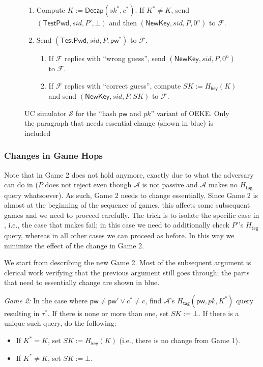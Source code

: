 \documentclass{article}
\theoremstyle{plain}
\theoremstyle{definition}
\theoremstyle{remark}
\newcommand{\adv}{\mathcal{A}}
\renewcommand{\sim}{\mathcal{S}}
\newcommand{\func}{\mathcal{F}}
\newcommand{\Decap}{\mathsf{Decap}}
\newcommand{\Hkey}{H_\mathsf{key}}
\newcommand{\Htag}{H_\mathsf{tag}}
\newcommand{\pw}{\mathsf{pw}}
\newcommand{\TestPwd}{\mathsf{TestPwd}}
\newcommand{\NewKey}{\mathsf{NewKey}}
\begin{document}
\begin{figure}[H]
\begin{framed}
\begin{small}
\begin{enumerate}
\begin{enumerate}
        \item Compute $K := \Decap(sk^*,c^*)$. If $K^* \neq K$, send $(\TestPwd, sid, P', \bot)$ and then $(\NewKey, sid, P, 0^n)$ to $\func$.
        \item Send $(\TestPwd, sid, P, \pw^*)$ to $\func$.
            \begin{enumerate}
              \item If $\func$ replies with ``wrong guess'', send $(\NewKey, sid, P, 0^n)$ to $\func$.
              \item If $\func$ replies with ``correct guess'', compute $SK := \Hkey(K)$ and send $(\NewKey, sid, P, SK)$ to $\func$.
            \end{enumerate}
      \end{enumerate}
\end{enumerate}
\end{small}
\end{framed}
\caption{UC simulator $\sim$ for the ``hash $\pw$ and $pk$'' variant of OEKE. Only the paragraph that needs essential change (shown in {\color{blue}blue}) is included}
\label{fig:oeke-sim-hash-pw-pk}
\end{figure}

\subsubsection{Changes in Game Hops}
\label{app:game-hops-hash-pw-pk}
Note that  in Game 2 does not hold anymore, exactly due to what the adversary can do in  ($P$ does not reject even though $\adv$ is not passive and $\adv$ makes no $\Htag$ query whatsoever). As such, Game 2 needs to change essentially. Since Game 2 is almost at the beginning of the sequence of games, this affects some subsequent games and we need to proceed carefully. The trick is to isolate the specific case in , i.e., the case that makes  fail; in this case we need to additionally check $P'$'s $\Htag$ query, whereas in all other cases we can proceed as before. In this way we minimize the effect of the change in Game 2.

We start from describing the new Game 2. Most of the subsequent argument is clerical work verifying that the previous argument still goes through; the parts that need to essentially change are shown in {\color{blue}blue}.

\medskip\noindent\emph{Game 2:} In the case where {\color{blue}$\pw \neq \pw' \lor c^* \neq c$}, find $\adv$'s $\Htag(\pw,pk,K^*)$ query resulting in $\tau^*$. If there is none or more than one, set $SK := \bot$. If there is a unique such query, do the following:
\begin{itemize}
  \item If $K^* = K$, set $SK := \Hkey(K)$ (i.e., there is no change from Game 1).
  \item If $K^* \neq K$, set $SK := \bot$.
\end{itemize}
\end{document}
